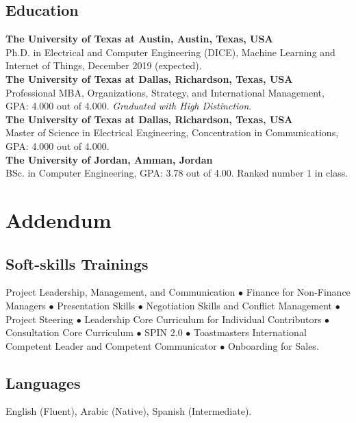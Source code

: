 \documentclass{article}
\begin{document}
\begin{center}
\subsection*{\sc Education}
\textbf{The University of Texas at Austin, Austin, Texas, USA} \\
Ph.D. in Electrical and Computer Engineering (DICE), Machine Learning and Internet of Things, December 2019 (expected). \\
\vspace*{0.1in}
\textbf{The University of Texas at Dallas, Richardson, Texas, USA} \\
Professional MBA, Organizations, Strategy, and International Management, GPA: 4.000 out of 4.000. \textit{Graduated with High Distinction}.\\
\vspace*{0.1in}
\textbf{The University of Texas at Dallas, Richardson, Texas, USA} \\
Master of Science in Electrical Engineering, Concentration in Communications, GPA: 4.000 out of 4.000. \\
\vspace*{0.1in}
\textbf{The University of Jordan, Amman, Jordan} \\
BSc. in Computer Engineering, GPA: 3.78 out of 4.00.  Ranked number 1 in class.
\end{center}
\newpage
\section*{\centering \sc \textbf{Addendum}}
\subsection*{\sc Soft-skills Trainings}
Project Leadership, Management, and Communication $\bullet$
Finance for Non-Finance Managers $\bullet$ Presentation Skills $\bullet$ Negotiation Skills and Conflict Management $\bullet$ Project Steering $\bullet$ Leadership Core Curriculum for Individual Contributors $\bullet$ Consultation Core Curriculum $\bullet$ SPIN 2.0 $\bullet$ Toastmasters International Competent Leader and Competent Communicator $\bullet$ Onboarding for Sales.
\vspace*{-0.1in}
\subsection*{\sc Languages}
English (Fluent), Arabic (Native), Spanish (Intermediate).
\vspace*{-0.1in}
\end{document}
